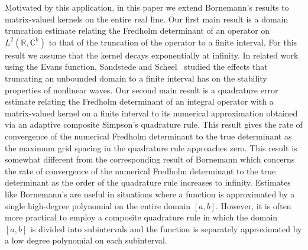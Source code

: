 \documentclass{birkjour}
\theoremstyle{definition}
\theoremstyle{remark}
\numberwithin{equation}{section}
\begin{document}
Motivated by this application, in this paper we  extend Bornemann's results 
to matrix-valued kernels on the entire real line. Our first main result is a  domain truncation
estimate relating the Fredholm determinant 
of an operator on $L^2(\mathbb R, \mathbb C^k) $ to that of the truncation 
of the operator to a finite interval. For this result we assume that the kernel
decays exponentially at infinity.
In related work using the Evans function, Sandstede and Scheel~\cite{SANDSTEDE2000233} studied the effects that truncating an unbounded domain to a finite interval has on the stability properties of nonlinear waves.
Our second main result is a quadrature error estimate
relating the Fredholm determinant of an integral operator with 
a matrix-valued kernel on a finite interval
to its numerical approximation  obtained via an adaptive composite Simpson's quadrature rule.
This result gives the rate of convergence of the numerical Fredholm determinant to the
true  determinant  as the maximum grid spacing in the quadrature rule approaches zero.
This result is somewhat different from the corresponding result of Bornemann
which concerns  the rate of convergence of the numerical Fredholm determinant to the
true  determinant as the order of the quadrature rule increases to infinity. 
Estimates like Bornemann's are useful 
in situations where a function is approximated by a single high-degree polynomial on the entire domain $[a,b]$.  However,  it is often more practical to 
employ a composite quadrature rule in which the domain $[a,b]$ is divided into 
subintervals and the function is separately approximated  by a low degree polynomial on each subinterval.
\end{document}
